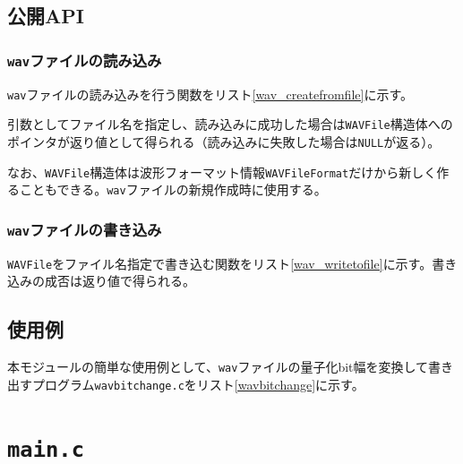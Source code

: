 \documentclass[uplatex,dvipdfmx,b5j,10pt]{jsbook}
\theoremstyle{definition}
\begin{document}
\subsection{公開API}

\subsubsection{\texttt{wav}ファイルの読み込み}

\texttt{wav}ファイルの読み込みを行う関数をリスト\ref{wav_createfromfile}に示す。


引数としてファイル名を指定し、読み込みに成功した場合は\texttt{WAVFile}構造体へのポインタが返り値として得られる（読み込みに失敗した場合は\texttt{NULL}が返る）。

なお、\texttt{WAVFile}構造体は波形フォーマット情報\texttt{WAVFileFormat}だけから新しく作ることもできる。\texttt{wav}ファイルの新規作成時に使用する。


\subsubsection{\texttt{wav}ファイルの書き込み}

\texttt{WAVFile}をファイル名指定で書き込む関数をリスト\ref{wav_writetofile}に示す。書き込みの成否は返り値で得られる。


\subsection{使用例}

本モジュールの簡単な使用例として、\texttt{wav}ファイルの量子化bit幅を変換して書き出すプログラム\texttt{wavbitchange.c}をリスト\ref{wavbitchange}に示す。


\section{\texttt{main.c}}
\end{document}
